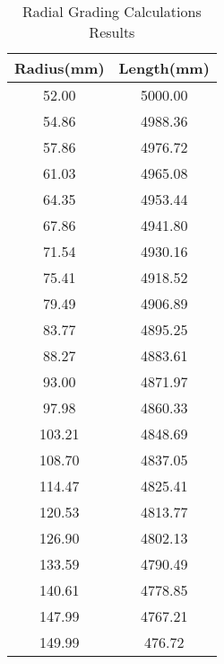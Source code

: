 \begin{table}[!htb]
\caption{Radial Grading Calculations Results}
\label{table:radialvals}
\begin{center}
\begin{tabular}{cc}
\toprule
\textbf{Radius(mm)} & \textbf{Length(mm)} \\ \toprule
52.00 & 5000.00 \\
54.86 & 4988.36 \\
57.86 & 4976.72 \\
61.03 & 4965.08 \\
64.35 & 4953.44 \\
67.86 & 4941.80 \\
71.54 & 4930.16 \\
75.41 & 4918.52 \\
79.49 & 4906.89 \\
83.77 & 4895.25 \\
88.27 & 4883.61 \\
93.00 & 4871.97 \\
97.98 & 4860.33 \\
103.21 & 4848.69 \\
108.70 & 4837.05 \\
114.47 & 4825.41 \\
120.53 & 4813.77 \\
126.90 & 4802.13 \\
133.59 & 4790.49 \\
140.61 & 4778.85 \\
147.99 & 4767.21 \\
149.99 & 476.72 \\
\bottomrule
\end{tabular}
\end{center}
\end{table}

